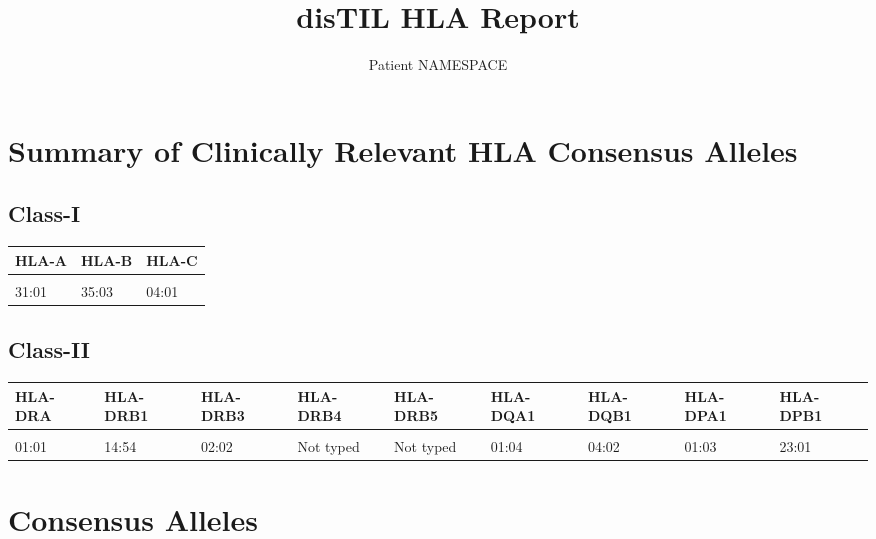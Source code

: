 \documentclass[
]{article}
\title{disTIL HLA Report}
\subtitle{Patient NAMESPACE}
\author{}
\date{\vspace{-2.5em}}
\begin{document}
\maketitle

\hypertarget{summary-of-clinically-relevant-hla-consensus-alleles}{%
\section{Summary of Clinically Relevant HLA Consensus
Alleles}\label{summary-of-clinically-relevant-hla-consensus-alleles}}

\hypertarget{class-i}{%
\subsection{Class-I}\label{class-i}}

\begingroup\fontsize{9}{11}\selectfont

\begin{tabular}{lll}
\toprule
HLA-A & HLA-B & HLA-C\\
\midrule
\cellcolor{gray!6}{03:01} & \cellcolor{gray!6}{39:01} & \cellcolor{gray!6}{12:03}\\
31:01 & 35:03 & 04:01\\
\bottomrule
\end{tabular}
\endgroup{}

\hypertarget{class-ii}{%
\subsection{Class-II}\label{class-ii}}

\begingroup\fontsize{9}{11}\selectfont

\begin{tabular}{lllllllll}
\toprule
HLA-DRA & HLA-DRB1 & HLA-DRB3 & HLA-DRB4 & HLA-DRB5 & HLA-DQA1 & HLA-DQB1 & HLA-DPA1 & HLA-DPB1\\
\midrule
\cellcolor{gray!6}{01:01} & \cellcolor{gray!6}{08:01} & \cellcolor{gray!6}{02:02} & \cellcolor{gray!6}{Not typed} & \cellcolor{gray!6}{Not typed} & \cellcolor{gray!6}{04:01} & \cellcolor{gray!6}{05:03} & \cellcolor{gray!6}{01:03} & \cellcolor{gray!6}{03:01}\\
01:01 & 14:54 & 02:02 & Not typed & Not typed & 01:04 & 04:02 & 01:03 & 23:01\\
\bottomrule
\end{tabular}
\endgroup{}

\newpage

\hypertarget{consensus-alleles}{%
\section{Consensus Alleles}\label{consensus-alleles}}
\end{document}
